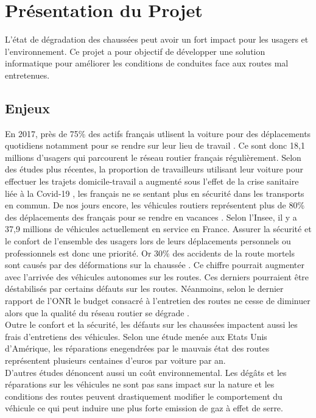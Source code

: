 \section{Présentation du Projet}
L'état de dégradation des chaussées peut avoir un fort impact pour les usagers
et l'environnement. Ce projet a pour objectif de développer une solution
informatique pour améliorer les conditions de conduites face aux routes mal
entretenues.

\subsection{Enjeux}
En 2017, près de 75\% des actifs français utlisent la voiture pour des déplacements quotidiens notamment pour se rendre sur leur lieu de travail \cite{insee}. Ce sont donc 18,1 millions d'usagers qui parcourent le réseau routier français régulièrement. Selon des études plus récentes, la proportion de travailleurs utilisant leur voiture pour effectuer les trajets domicile-travail a augmenté sous l'effet de la crise sanitaire liée à la Covid-19 \cite{covid}, les français ne se sentant plus en sécurité dans les transports en commun.
De nos jours encore, les véhicules routiers représentent plus de 80\% des déplacements des français pour se rendre en vacances \cite{vacances}.
Selon l'Insee, il y a 37,9 millions de véhicules actuellement en service en France.
Assurer la sécurité et le confort de l'ensemble des usagers lors de leurs déplacements personnels ou professionnels est donc une priorité. Or 30\% des accidents de la route mortels sont causés par des déformations sur la chaussée \cite{europe1}. Ce chiffre pourrait augmenter avec l'arrivée des véhicules autonomes sur les routes. Ces derniers pourraient être déstabilisés par certains défauts sur les routes.
Néanmoins, selon le dernier rapport de l'ONR le budget consacré à l'entretien des routes ne cesse de diminuer \cite{onr} alors que la qualité du réseau routier se dégrade \cite{tf1}.\\

Outre le confort et la sécurité, les défauts sur les chaussées impactent aussi les frais d'entretiens des véhicules. Selon une étude menée aux Etats Unis d'Amérique, les réparations enegendrées par le mauvais état des routes représentent plusieurs centaines d'euros par voiture par an.\\

D'autres études dénoncent aussi un coût environnemental. Les dégâts et les réparations sur les véhicules ne sont pas sans impact sur la nature \cite{pneus} et les conditions des routes peuvent drastiquement modifier le comportement du véhicule ce qui peut induire une plus forte emission de gaz à effet de serre.

